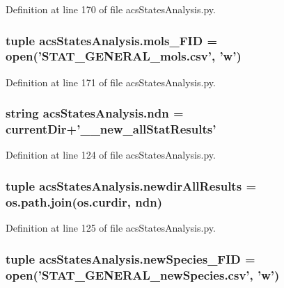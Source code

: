 Definition at line 170 of file acs\-States\-Analysis.\-py.

\hypertarget{a00099_a603a41889d8732146d44da83ffaf0489}{
\subsubsection[{mols\-\_\-\-F\-I\-D}]{\setlength{\rightskip}{0pt plus 5cm}tuple acs\-States\-Analysis.\-mols\-\_\-\-F\-I\-D = open('S\-T\-A\-T\-\_\-\-G\-E\-N\-E\-R\-A\-L\-\_\-mols.\-csv', 'w')}}\label{a00099_a603a41889d8732146d44da83ffaf0489}


Definition at line 171 of file acs\-States\-Analysis.\-py.

\hypertarget{a00099_a5e117df6e0cdffdae13947622c6c4890}{
\subsubsection[{ndn}]{\setlength{\rightskip}{0pt plus 5cm}string acs\-States\-Analysis.\-ndn = {\bf current\-Dir}+'\-\_\-\_\-new\-\_\-all\-Stat\-Results'}}\label{a00099_a5e117df6e0cdffdae13947622c6c4890}


Definition at line 124 of file acs\-States\-Analysis.\-py.

\hypertarget{a00099_a62d6cfd52b4428ab7ea4d75d43b2d49b}{
\subsubsection[{newdir\-All\-Results}]{\setlength{\rightskip}{0pt plus 5cm}tuple acs\-States\-Analysis.\-newdir\-All\-Results = os.\-path.\-join(os.\-curdir, {\bf ndn})}}\label{a00099_a62d6cfd52b4428ab7ea4d75d43b2d49b}


Definition at line 125 of file acs\-States\-Analysis.\-py.

\hypertarget{a00099_abdb6e583333cc08cac8c63631db80b5b}{
\subsubsection[{new\-Species\-\_\-\-F\-I\-D}]{\setlength{\rightskip}{0pt plus 5cm}tuple acs\-States\-Analysis.\-new\-Species\-\_\-\-F\-I\-D = open('S\-T\-A\-T\-\_\-\-G\-E\-N\-E\-R\-A\-L\-\_\-new\-Species.\-csv', 'w')}}\label{a00099_abdb6e583333cc08cac8c63631db80b5b}


